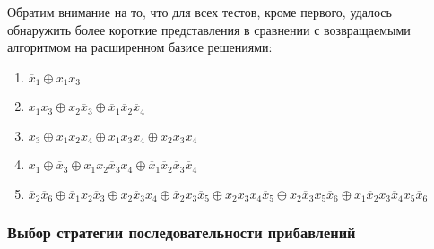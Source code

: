 \documentclass[a4paper,12pt,titlepage,finall]{article}
\begin{document}
Обратим внимание на то, что для всех тестов, кроме первого, удалось обнаружить более короткие представления в сравнении с возвращаемыми алгоритмом на расширенном базисе решениями:
\begin{enumerate}
    \item $ \overline x_1 \oplus x_1 x_3 $
    \item $ x_1 x_3 \oplus x_2 \overline x_3 \oplus \overline x_1 \overline x_2 \overline x_4 $
    \item $ x_3 \oplus x_1 x_2 x_4 \oplus \overline x_1 \overline x_3 x_4 \oplus x_2 x_3 x_4 $
    \item $ x_1 \oplus \overline x_3 \oplus x_1 x_2 \overline x_3 x_4 \oplus \overline x_1 \overline x_2 \overline x_3 \overline x_4 $
    \item $ \overline x_2 \overline x_6 \oplus \overline x_1 x_2 \overline x_3 \oplus x_2 \overline x_3 x_4 \oplus \overline x_2 x_3 \overline x_5 \oplus x_2 x_3 x_4 \overline x_5 \oplus x_2 \overline x_3 x_5 \overline x_6 \oplus x_1 \overline x_2 x_3 \overline x_4 x_5 \overline x_6 $
\end{enumerate}

\subsubsection{Выбор стратегии последовательности прибавлений}
\end{document}
